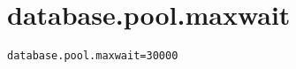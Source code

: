 \section{database.pool.maxwait}
\label{configuration:DatabasePoolMaxwait}
\ClearAPI
\TODO
{}
\begin{lstlisting}[style=Props,caption={Usage example for \textit{database.pool.maxwait}}]
database.pool.maxwait=30000
\end{lstlisting}